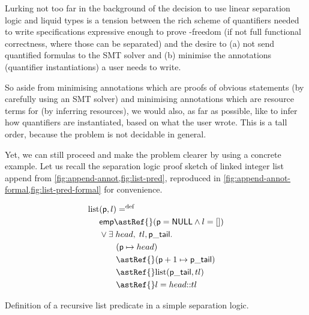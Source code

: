 Lurking not too far in the background of the decision to use linear separation
logic and liquid types is a tension between the rich scheme of quantifiers
needed to write specifications expressive enough to prove -freedom (if
not full functional correctness, where those can be separated) and the desire
to (a) not send quantified formulas to the SMT solver and (b) minimise the
annotations (quantifier instantiations) a user needs to write.

So aside from minimising annotations which are proofs of obvious statements (by
carefully using an SMT solver) and minimising annotations which are resource
terms for (by inferring resources), we would also, as far as possible, like to
infer how quantifiers are instantiated, based on what the user wrote. This is a tall order,
because the problem is not decidable in general.

Yet, we can still proceed and make the problem clearer by using a concrete
example. Let us recall the separation logic proof sketch of linked integer list
append from \cref{fig:append-annot,fig:list-pred}, reproduced in
\cref{fig:append-annot-formal,fig:list-pred-formal} for convenience.

\begin{marginfigure}
    \centering
    \begin{align*}
        \mathrm{list} &(\mathsf{p}, l) \mathrel{{=}^\mathrm{def}} \\
                      &\mathsf{emp} \astRef{} (\mathsf{p} = \mathsf{NULL} \wedge{} l = []) \\
                      &\vee{} \exists{} \; {head}, \; {tl}, \mathsf{p\_tail}.\\
                      &\qquad (\mathsf{p} \mapsto{} {head}) \\
                      &\qquad \astRef{} (\mathsf{p} + 1 \mapsto{} \mathsf{p\_tail}) \\
                      &\qquad \astRef{} \mathrm{list} (\mathsf{p\_tail}, {tl}) \\
                      &\qquad \astRef{} l = {head} {:}{:} {tl} \\
    \end{align*}
    \caption{Definition of a recursive list predicate in a simple separation
        logic.}\label{fig:list-pred-formal}
\end{marginfigure}

